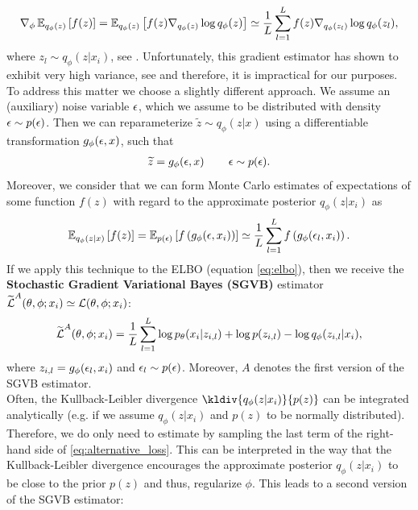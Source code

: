 \begin{align*}
\nabla_{\phi} \operatorname{\mathbb{E}}_{q_{\phi}(z)} \left[ f(z) \right] = \operatorname{\mathbb{E}}_{q_{\phi}(z)} \left[ f(z) \nabla_{q_{\phi}(z)}\log q_{\phi} (z)\right] \simeq \frac{1}{L} \sum_{l=1}^L f(z) \nabla_{q_{\phi}(z_l)}\log q_{\phi} (z_l),
\end{align*}
where $z_l \sim q_{\phi}(z|x_i)$, see \cite[Section~2.2]{kingma2013auto}. Unfortunately, this gradient estimator has shown to exhibit very high variance, see \cite{paisley2012variational} and therefore, it is impractical for our purposes. To address this matter we choose a slightly different approach. We assume an (auxiliary) noise variable $\operatorname{\epsilon}$, which we assume to be distributed with density $\operatorname{\epsilon}\sim p(\operatorname{\epsilon})$. Then we can reparameterize $\tilde{z}\sim q_{\phi}(z|x)$ using a differentiable transformation $g_{\phi}(\operatorname{\epsilon}, x)$, such that
\begin{align*}
\widetilde{z} = g_{\phi} (\operatorname{\epsilon}, x)\qquad \operatorname{\epsilon} \sim p(\operatorname{\epsilon}).
\end{align*}
Moreover, we consider that we can form Monte Carlo estimates of expectations of some function $f(z)$ with regard to the approximate posterior $q_{\phi}(z|x_i)$ as
\begin{align*}
\operatorname{\mathbb{E}}_{q_{\phi}(z|x)} \left[ f(z) \right] = \operatorname{\mathbb{E}}_{p(\operatorname{\epsilon})} \left[ f\left(g_{\phi} (\operatorname{\epsilon}, x_i)\right) \right] \simeq \frac{1}{L} \sum_{l=1}^L f\left(g_{\phi} (\operatorname{\epsilon}_l, x_i) \right).
\end{align*}
If we apply this technique to the ELBO (equation \eqref{eq:elbo}), then we receive the \textbf{Stochastic Gradient Variational Bayes (SGVB)} estimator $\widetilde{\operatorname{\mathcal{L}}}^{A}(\theta, \phi; x_i) \simeq \operatorname{\mathcal{L}}(\theta, \phi; x_i)$:
\begin{align*}
\widetilde{\operatorname{\mathcal{L}}}^{A}(\theta, \phi; x_i) = \frac{1}{L} \sum_{l=1}^L \log  p_{\theta}(x_i|z_{i,l}) + \log p(z_{i,l}) - \log q_{\phi}(z_{i,l}|x_i),
\end{align*}
where $z_{i,l} = g_{\phi} (\operatorname{\epsilon}_l, x_i)$ and $\operatorname{\epsilon}_l\sim p(\operatorname{\epsilon})$. Moreover, $A$ denotes the first version of the SGVB estimator.\\
Often, the Kullback-Leibler divergence $\kldiv{q_{\phi}(z|x_i)}{p(z)}$ can be integrated analytically (e.g. if we assume $q_{\phi}(z|x_i)$ and $p(z)$ to be normally distributed). Therefore, we do only need to estimate by sampling the last term of the right-hand side of \eqref{eq:alternative_loss}. This can be interpreted in the way that the Kullback-Leibler divergence encourages the approximate posterior $q_{\phi}(z|x_i)$ to be close to the prior $p(z)$ and thus, regularize $\phi$. This leads to a second version of the SGVB estimator:
